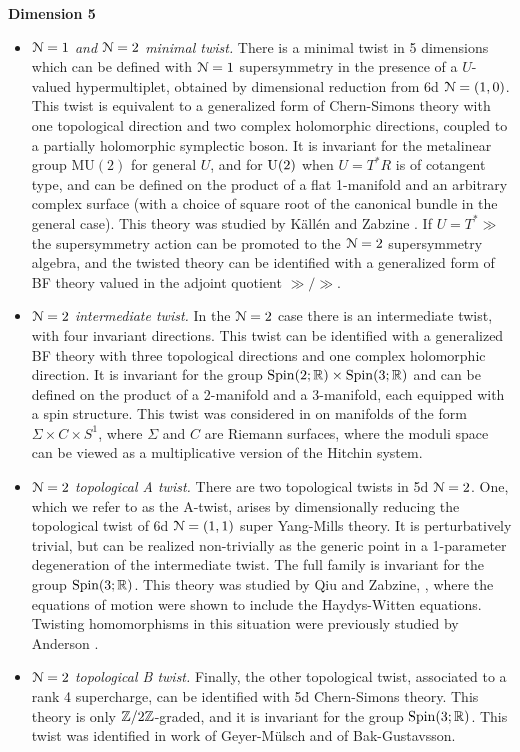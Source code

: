 \documentclass[10pt, oneside]{article}
\newcommand{\MU}{\mathrm{MU}}
\begin{document}
\textbf{Dimension 5}
\begin{itemize}
 \item \emph{$\mathcal{N}=1$ and $\mathcal{N}=2$ minimal twist.}  There is a minimal twist in 5 dimensions which can be defined with $\mathcal{N}=1$ supersymmetry in the presence of a $U$-valued hypermultiplet, obtained by dimensional reduction from 6d $\mathcal{N}=(1,0)$.  This twist is equivalent to a generalized form of Chern-Simons theory with one topological direction and two complex holomorphic directions, coupled to a partially holomorphic symplectic boson.  It is invariant for the metalinear group $\MU(2)$ for general $U$, and for $\mathrm{U}(2)$ when $U = T^*R$ is of cotangent type, and can be defined on the product of a flat 1-manifold and an arbitrary complex surface (with a choice of square root of the canonical bundle in the general case).  This theory was studied by K\"all\'en and Zabzine  \cite{KallenZabzine}.  If $U = T^*\gg$ the supersymmetry action can be promoted to the $\mathcal{N}=2$ supersymmetry algebra, and the twisted theory can be identified with a generalized form of BF theory valued in the adjoint quotient $\gg/\gg$.
 \item \emph{$\mathcal{N}=2$ intermediate twist.} In the $\mathcal{N}=2$ case there is an intermediate twist, with four invariant directions.  This twist can be identified with a generalized BF theory with three topological directions and one complex holomorphic direction.  It is invariant for the group $\mathrm{Spin}(2;\mathbb R) \times \mathrm{Spin}(3;\mathbb R)$ and can be defined on the product of a 2-manifold and a 3-manifold, each equipped with a spin structure.  This twist was considered in \cite{ElliottPestun} on manifolds of the form $\Sigma \times C \times S^1$, where $\Sigma$ and $C$ are Riemann surfaces, where the moduli space can be viewed as a multiplicative version of the Hitchin system.
 \item \emph{$\mathcal{N}=2$ topological A twist.} There are two topological twists in 5d $\mathcal{N}=2$.  One, which we refer to as the A-twist, arises by dimensionally reducing the topological twist of 6d $\mathcal{N}=(1,1)$ super Yang-Mills theory.  It is perturbatively trivial, but can be realized non-trivially as the generic point in a 1-parameter degeneration of the intermediate twist.  The full family is invariant for the group $\mathrm{Spin}(3;\mathbb R)$.  This theory was studied by Qiu and Zabzine, \cite{QiuZabzine}, where the equations of motion were shown to include the Haydys-Witten equations.  Twisting homomorphisms in this situation were previously studied by Anderson \cite{Anderson}.
 \item \emph{$\mathcal{N}=2$ topological B twist.} Finally, the other topological twist, associated to a rank 4 supercharge, can be identified with 5d Chern-Simons theory.  This theory is only $\mathbb Z/2\mathbb Z$-graded, and it is invariant for the group $\mathrm{Spin}(3;\mathbb R)$.  This twist was identified in work of Geyer-M\"ulsch and of Bak-Gustavsson\cite{GeyerMuelsch, BakGustavsson1,BakGustavsson2}.
\end{itemize}
\end{document}
